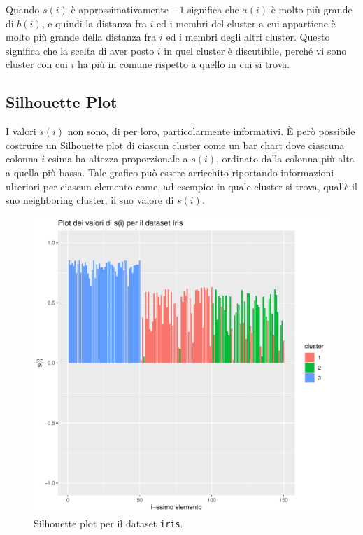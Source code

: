 \documentclass[italian]{article}
\begin{document}
			Quando $s(i)$ è approssimativamente $-1$ significa che $a(i)$ è molto
			più grande di $b(i)$, e quindi la distanza fra $i$ ed i membri del
			cluster a cui appartiene è molto più grande della distanza fra $i$
			ed i membri degli altri cluster. Questo significa che la scelta di
			aver posto $i$ in quel cluster è discutibile, perché vi sono cluster
			con cui $i$ ha più in comune rispetto a quello in cui si trova.


		\subsection{Silhouette Plot}

			I valori $s(i)$ non sono, di per loro, particolarmente informativi.
			È però possibile costruire un Silhouette plot di ciascun cluster
			come un bar chart dove ciascuna colonna $i$-esima ha altezza
			proporzionale a $s(i)$, ordinato dalla colonna più alta a quella
			più bassa. Tale grafico può essere arricchito riportando informazioni
			ulteriori per ciascun elemento come, ad esempio: in quale cluster si
			trova, qual'è il suo neighboring cluster, il suo valore di $s(i)$.

			\begin{figure}[h]
				\includegraphics[width = \textwidth]{doc/si.pdf}
				\caption{Silhouette plot per il dataset \texttt{iris}.}
				\label{fig:si}
			\end{figure}
\end{document}
